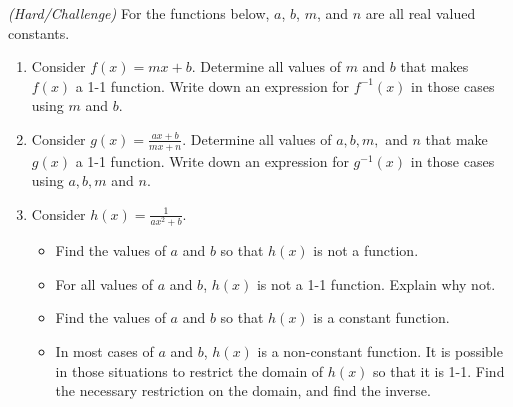 \documentclass{ximera}
\begin{document}
\begin{exercise} \textit{(Hard/Challenge)} For the functions below, $a$, $b$, $m$, and $n$ are all real valued constants. 
\begin{enumerate}
\item Consider $f(x)=mx+b$. Determine all values of $m$ and $b$ that makes $f(x)$ a 1-1 function. Write down an expression for $f^{-1}(x)$ in those cases using $m$ and $b$. 
\item Consider $\displaystyle g(x)=\frac{ax+b}{mx+n}$. Determine all values of $a, b, m,$ and $n$ that make $g(x)$ a 1-1 function. Write down an expression for $g^{-1}(x)$ in those cases using $a, b, m$ and $n$.
\item Consider $h(x)=\frac{1}{ax^2+b}$. 
\begin{itemize}
\item Find the values of $a$ and $b$ so that $h(x)$ is not a function.
\item For all values of $a$ and $b$, $h(x)$ is not a 1-1 function. Explain why not.
\item Find the values of $a$ and $b$ so that $h(x)$ is a constant function. 
\item In most cases of $a$ and $b$, $h(x)$ is a non-constant function. It is possible in those situations to restrict the domain of $h(x)$ so that it is 1-1. Find the necessary restriction on the domain, and find the inverse. 
\end{itemize}  
\end{enumerate}

\end{exercise}
\end{document}
